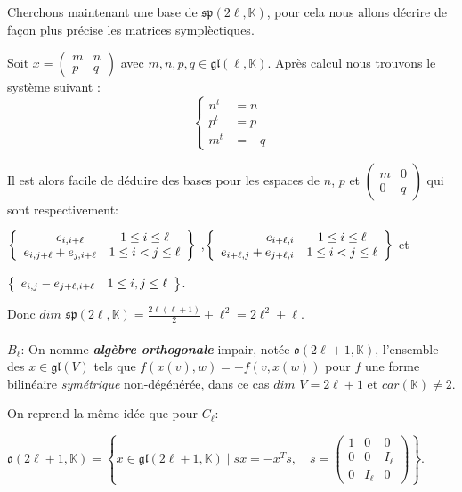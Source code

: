\documentclass[a4paper,openany,12pt]{report}
\newcommand{\KK}{\mathbb{K}}
\newcommand{\gl}{\mathfrak{gl}}
\newcommand{\ssp}{\mathfrak{sp}}
\newcommand{\oo}{\mathfrak{o}}
\theoremstyle{break}
{\theorembodyfont{\upshape}
\newtheorem*{rmq}{Remarque :}
\newtheorem*{prv}{Preuve :}
\newtheorem*{ex}{Exemples :}
\newtheorem*{exe}{Exemple : }
\newtheorem*{nota}{Notation :}
\newtheorem*{dem}{D\'emonstration :}}
\begin{document}
Cherchons maintenant une base de $\ssp(2 \ell,\KK)$, pour cela nous allons décrire de façon plus précise les matrices symplèctiques.

Soit $ x=\begin{pmatrix} m & n \\ p & q \end{pmatrix}$ avec $m,n,p,q \in \gl(\ell, \KK)$. Après calcul nous trouvons le système suivant : 
\[ \left\{
\begin{aligned}
n^t & = n \\
p^t & =p \\
 m^t & = -q
\end{aligned}
\right. \]

Il est alors facile de déduire des bases pour les espaces de $n$, $p$ et $\begin{pmatrix} m & 0 \\ 0 & q \end{pmatrix}$ qui sont respectivement: 
\begin{center}
$\left \{
   \begin{array}{r c l}
e_{i,i+\ell}\quad & 1\leq i \leq \ell \\
e_{i,j+\ell}+e_{j,i+\ell} & 1\leq i < j \leq \ell
   \end{array}
   \right  \}$
,$\left \{
   \begin{array}{r c l}
e_{i+\ell,i} &1\leq i \leq \ell \\
e_{i+\ell,j}+e_{j+\ell,i} & 1\leq i < j \leq \ell
   \end{array}
  \right   \} $
et 
\end{center}
\begin{center}
$\left \{
   \begin{array}{r c l}
e_{i,j}-e_{j+\ell,i+\ell} &1\leq i ,j \leq \ell
   \end{array}
\right   \}$.
\end{center}

Donc $dim$ $\ssp(2\ell,\KK) = \frac{2\ell(\ell+1)}{2} +\ell^2 = 2\ell^2+ \ell $.\\
\\
$ B_{\ell} $: On nomme \emph{\textbf{algèbre orthogonale}} impair, notée  $\oo(2\ell+1,\KK)$, l'ensemble des $x \in \gl(V)$ tels que $f(x(v),w)=-f(v,x(w))$ pour $f$ une forme bilinéaire \textit{symétrique} non-dégénérée, dans ce cas $dim$ $V=2\ell+1$ et $car(\KK) \ne 2$.

On reprend la même idée que pour $ C_{\ell} $:
\begin{center}
$\oo(2\ell+1,\KK)= \left \{ x \in \gl(2\ell+1, \KK) \mid sx= -x^Ts,\quad s = \begin{pmatrix} 1 & 0 & 0 \\ 0 & 0 & I_\ell \\ 0 & I_\ell & 0 \end{pmatrix} \right \}$.
\end{center}
\end{document}
